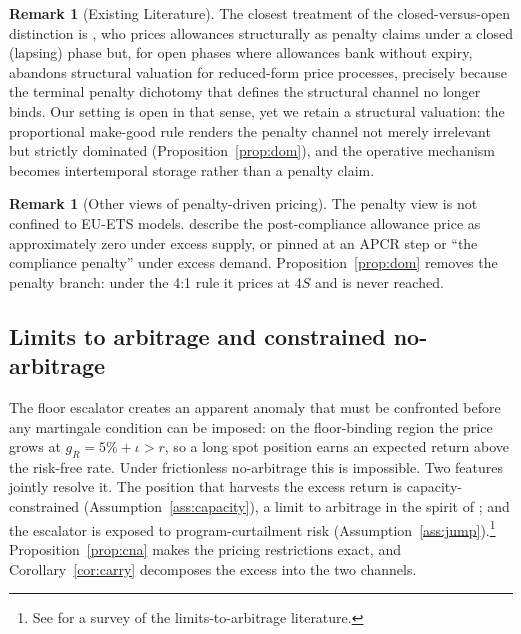 \documentclass[11pt,letterpaper]{article}
\theoremstyle{plain}
\theoremstyle{definition}
\newtheorem{remark}[theorem]{Remark}
\numberwithin{equation}{section}
\begin{document}
\begin{remark}[Existing Literature]\label{rem:fang} The closest treatment of the closed-versus-open distinction is \citet{fang2019}, who prices allowances structurally as penalty claims under a closed (lapsing) phase but, for open phases where allowances bank without expiry, abandons structural valuation for reduced-form price processes, precisely because the terminal penalty dichotomy that defines the structural channel no longer binds. Our setting is open in that sense, yet we retain a structural valuation: the proportional make-good rule renders the penalty channel not merely irrelevant but strictly dominated (Proposition~\ref{prop:dom}), and the operative mechanism becomes intertemporal storage rather than a penalty claim.
\end{remark}

\begin{remark}[Other views of penalty-driven pricing]\label{rem:otherviews}
The penalty view is not confined to EU-ETS models. \citet{borenstein2019} describe the post-compliance allowance price as approximately zero under excess supply, or pinned at an APCR step or ``the compliance penalty'' under excess demand. Proposition~\ref{prop:dom} removes the penalty branch: under the 4:1 rule it prices at $4S$ and is never reached.
\end{remark}

\subsection{Limits to arbitrage and constrained no-arbitrage}\label{sec:frictions}

The floor escalator creates an apparent anomaly that must be confronted before any martingale condition can be imposed: on the floor-binding region the price grows at $g_R = 5\% + \iota > r$, so a long spot position earns an expected return above the risk-free rate. Under frictionless no-arbitrage this is impossible. Two features jointly resolve it. The position that harvests the excess return is capacity-constrained (Assumption~\ref{ass:capacity}), a limit to arbitrage in the spirit of \citet{shleifer1997}; and the escalator is exposed to program-curtailment risk (Assumption~\ref{ass:jump}).\footnote{See \citet{gromb2010} for a survey of the limits-to-arbitrage literature.} Proposition~\ref{prop:cna} makes the pricing restrictions exact, and Corollary~\ref{cor:carry} decomposes the excess into the two channels.
\end{document}
